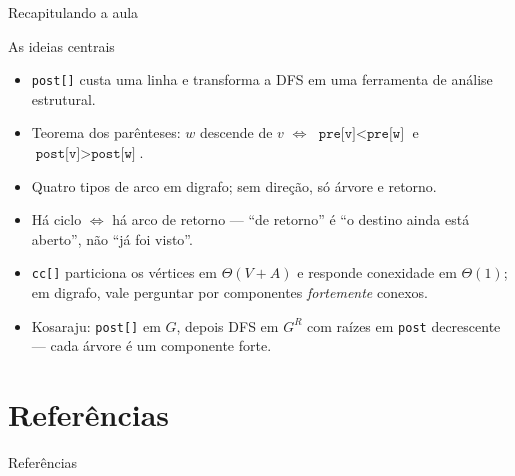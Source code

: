 \documentclass[aspectratio=169]{beamer}
\begin{document}
\begin{frame}{Recapitulando a aula}
  \begin{block}{As ideias centrais}
    \begin{itemize}\small\setlength{\itemsep}{0pt}
      \item \texttt{post[]} custa uma linha e transforma a DFS em uma ferramenta
            de análise estrutural.
      \item Teorema dos parênteses: $w$ descende de $v$ $\iff$
            $\texttt{pre[v]} < \texttt{pre[w]}$ e $\texttt{post[v]} > \texttt{post[w]}$.
      \item Quatro tipos de arco em digrafo; sem direção, só árvore e retorno.
      \item Há ciclo $\iff$ há arco de retorno --- ``de retorno'' é ``o destino
            ainda está aberto'', não ``já foi visto''.
      \item \texttt{cc[]} particiona os vértices em $\Theta(V+A)$ e responde
            conexidade em $\Theta(1)$; em digrafo, vale perguntar por
            componentes \emph{fortemente} conexos.
      \item Kosaraju: \texttt{post[]} em $G$, depois DFS em $G^R$ com raízes em
            \texttt{post} decrescente --- cada árvore é um componente forte.
    \end{itemize}
  \end{block}
\end{frame}

\section*{Referências}
\begin{frame}[allowframebreaks]{Referências}
  \scriptsize
  \nocite{*}
  
  
\end{frame}
\end{document}
